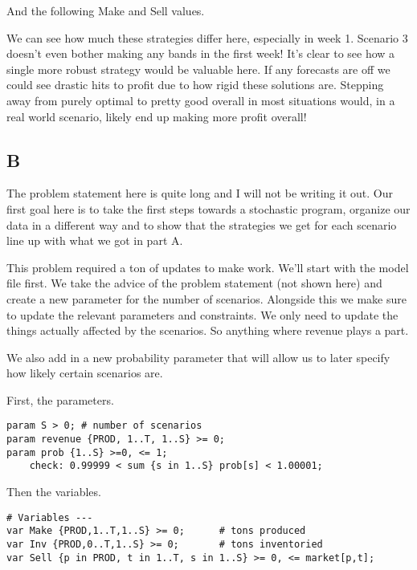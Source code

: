 And the following Make and Sell values.



We can see how much these strategies differ here, especially in week 1. Scenario 3 doesn't even bother making any bands in the first week! It's clear to see how a single more robust strategy would be valuable here. If any forecasts are off we could see drastic hits to profit due to how rigid these solutions are. Stepping away from purely optimal to pretty good overall in most situations would, in a real world scenario, likely end up making more profit overall!

\subsection*{B}

\prob

The problem statement here is quite long and I will not be writing it out. Our first goal here is to take the first steps towards a stochastic program, organize our data in a different way and to show that the strategies we get for each scenario line up with what we got in part A. 

\sol

This problem required a ton of updates to make work. We'll start with the model file first. We take the advice of the problem statement (not shown here) and create a new parameter for the number of scenarios. Alongside this we make sure to update the relevant parameters and constraints. We only need to update the things actually affected by the scenarios. So anything where revenue plays a part.

We also add in a new probability parameter that will allow us to later specify how likely certain scenarios are.

First, the parameters.

\begin{lstlisting}
param S > 0; # number of scenarios
param revenue {PROD, 1..T, 1..S} >= 0;
param prob {1..S} >=0, <= 1;
    check: 0.99999 < sum {s in 1..S} prob[s] < 1.00001;
\end{lstlisting}

Then the variables.

\begin{lstlisting}
# Variables ---
var Make {PROD,1..T,1..S} >= 0;      # tons produced
var Inv {PROD,0..T,1..S} >= 0;       # tons inventoried
var Sell {p in PROD, t in 1..T, s in 1..S} >= 0, <= market[p,t];
\end{lstlisting}

